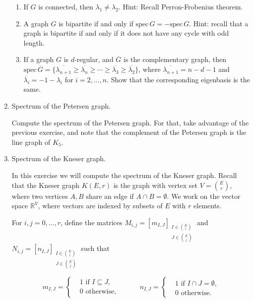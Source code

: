 \documentclass[kulak]{tplt}
\theoremstyle{definition}
\newcommand{\R}{\mathbb{R}}
\newcommand{\spec}{\mathrm{spec}}
\begin{document}
\begin{enumerate}
\begin{enumerate}
\item If $G$ is connected, then $\lambda_1 \neq \lambda_2$. Hint: Recall Perron-Frobenius theorem.

\item A graph $G$ is bipartite if and only if $\spec \, G = - \spec \, G$.
Hint: recall that a graph is bipartite if and only if it does not have any cycle with odd length.

\item If a graph $G$ is $d$-regular, and $\overline{G}$ is the complementary graph, then $\spec \, \overline{G} = \{ \overline{\lambda_{n+1}} \geq  \overline{\lambda_{n}} \geq  \cdots \geq  \overline{\lambda_{3}} \geq  \overline{\lambda_{2}} \}$, where $\overline{\lambda_{n+1}} = n - d - 1$ and $\overline{\lambda_i} = - 1 - \lambda _ i$ for $i = 2, \ldots, n$.
Show that the corresponding eigenbasis is the same.
\end{enumerate}


\item Spectrum of the Petersen graph.

Compute the spectrum of the Petersen graph.
For that, take advantage of the previous exercise, and note that the complement of the Petersen graph is the line graph of $K_5$.

\item Spectrum of the Kneser graph.

In this exercise we will compute the spectrum of the Kneser graph.
Recall that the Kneser graph $K(E, r)$ is the graph with vertex set $V = \binom{E}{r}$, where two vertices $A, B$ share an edge if $A \cap B = \emptyset$.
We work on the vector space $\R^V$, where vectors are indexed by subsets of $E$ with $r$ elements.

For $i, j = 0, \ldots, r$, define the matrices $M_{i, j} = [m_{I, J}]_{\substack{I\in \binom{E}{i} \\ J \in \binom{E}{j}}}$ and $N_{i, j} = [n_{I, J}]_{\substack{I\in \binom{E}{i} \\ J \in \binom{E}{j}}}$ such that 

$$ m_{I, J} =\begin{cases*}
      & 1 \text{ if $I \subseteq J$,}\\
      & 0 \text{ otherwise,}
    \end{cases*}  \quad \quad \quad 
     n_{I, J} =\begin{cases*}
      & 1 \text{ if $I \cap J = \emptyset $,}\\
      & 0 \text{ otherwise.}
    \end{cases*}  $$


\end{enumerate}
\end{document}
